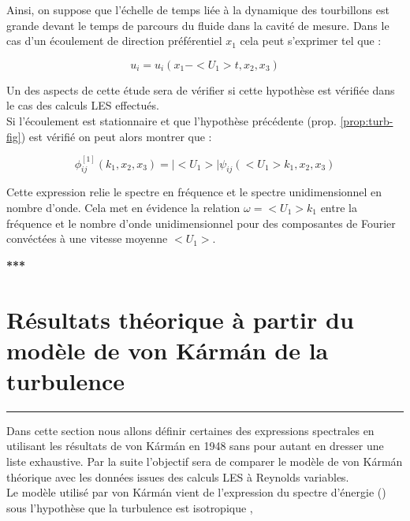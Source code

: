\documentclass[12pt]{article}
\theoremstyle{plain}
\theoremstyle{remark}
\begin{document}
		Ainsi, on suppose que l'échelle de temps liée à la dynamique des tourbillons est grande devant le temps de parcours du fluide dans la cavité de mesure. Dans le cas d'un écoulement de direction préférentiel $x_1$ cela peut s'exprimer tel que :
		
		\begin{equation}
			u_i=u_i(x_1-<U_1>t,x_2,x_3)
		\end{equation}
	
		Un des aspects de cette étude sera de vérifier si cette hypothèse est vérifiée dans le cas des calculs LES effectués. \\
		
		Si l'écoulement est stationnaire et que l'hypothèse précédente (prop. \ref{prop:turb-fig}) est vérifié on peut alors montrer que :
		
		\begin{equation}
			\phi_{ij}^{[1]}(k_1,x_2,x_3)=|<U_1>|\psi_{ij}(<U_1>k_1,x_2,x_3)
			\label{fig:turb-fig}
		\end{equation}
	
		Cette expression relie le spectre en fréquence et le spectre unidimensionnel en nombre d'onde. Cela met en évidence la relation $\omega=<U_1>k_1$ entre la fréquence et le nombre d'onde unidimensionnel pour des composantes de Fourier convéctées à une vitesse moyenne $<U_1>$. 
		
		
\begin{center}
	\large {\bf{***}}
\end{center}

\vspace{0.3cm}
\section{Résultats théorique à partir du modèle de von Kármán de la turbulence}
\noindent\rule{\linewidth}{2pt}
\vspace{0.1cm}
		
	Dans cette section nous allons définir certaines des expressions spectrales en utilisant les résultats de von Kármán en 1948 \cite{vonkarman1948} sans pour autant en dresser une liste exhaustive. Par la suite l'objectif sera de comparer le modèle de von Kármán théorique avec les données issues des calculs LES à Reynolds variables. \\
	
	Le modèle utilisé par von Kármán vient de l'expression du spectre d'énergie () sous l'hypothèse que la turbulence est isotropique \cite{wilson1998turbulence},
	
\end{document}
